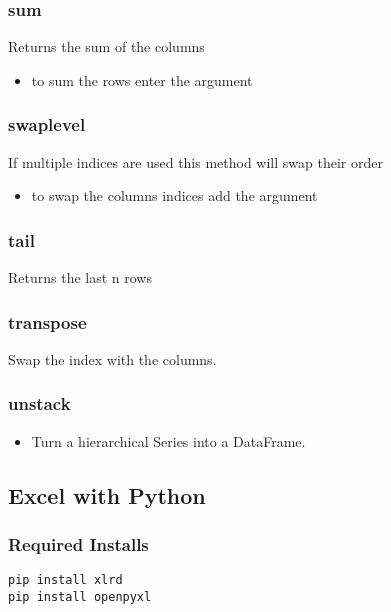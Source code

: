 %
\subsubsection{sum}
Returns the sum of the columns
  \begin{itemize}

    \item to sum the rows enter the argument \color{red}{axis=1}
  \end{itemize}

%
\subsubsection{swaplevel}
If multiple indices are used this method will swap their order
  \begin{itemize}

    \item to swap the columns indices add the argument {\color{red}{axis=1}}
  \end{itemize}

%
\subsubsection{tail}
Returns the last n rows

%
\subsubsection{transpose}
Swap the index with the columns.

%
\subsubsection{unstack}
\begin{itemize}
  \item Turn a hierarchical Series into a DataFrame.
\end{itemize}

\subsection{Excel with Python}

%
\subsubsection{Required Installs}
\begin{lstlisting}
pip install xlrd
pip install openpyxl
\end{lstlisting}

